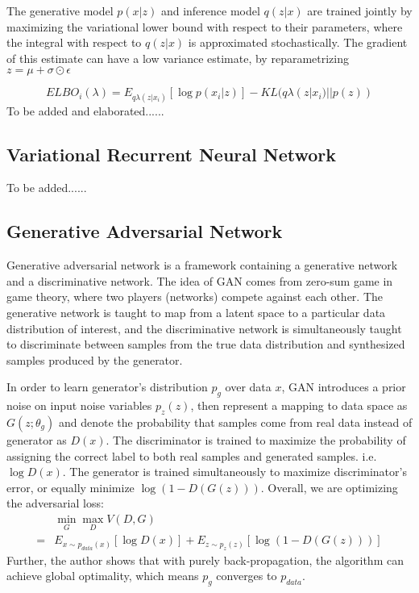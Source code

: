 \documentclass{article}
\begin{document}
The generative model $p(x|z)$ and inference model $q(z|x)$ are trained jointly by maximizing the variational lower bound with respect to their parameters, where the integral with respect to $q(z|x)$ is approximated stochastically. The gradient of this estimate can have a low variance estimate, by reparametrizing $z = \mu+\sigma\odot\epsilon$

$$ELBO_i (\lambda) = E_{q\lambda (z|x_i)}[\log p(x_i|z)]-KL(q\lambda (z|x_i)||p(z))$$ 
To be added and elaborated......


\subsection{Variational Recurrent Neural Network}
\cite{vrnn} 
To be added......

\subsection{Generative Adversarial Network} 
\cite{gan} 
 
\cite{ganncm}

Generative adversarial network is a framework containing a generative network and a discriminative network. The idea of GAN comes from zero-sum game in game theory, where two players (networks) compete against each other. The generative network is taught to map from a latent space to a particular data distribution of interest, and the discriminative network is simultaneously taught to discriminate between samples from the true data distribution and synthesized samples produced by the generator.

In order to learn generator's distribution $p_g$ over data $x$, GAN introduces a prior noise on input noise variables $p_z(z)$, then represent a mapping to data space as $G(z;\theta_g)$ and denote the probability that samples come from real data instead of generator as $D(x)$. The discriminator is trained to maximize the probability of assigning the correct label to both real samples and generated samples. i.e. $\log D(x)$. The generator is trained simultaneously to maximize discriminator's error, or equally minimize $\log (1-D(G(z)))$. Overall, we are optimizing the adversarial loss:
\begin{align*}
& \min_G \max_D V(D,G) \\
= & E_{x\sim p_{data}(x)}[\log D(x)] + E_{z\sim p_z(z)}[\log (1-D(G(z)))]
\end{align*}
Further, the author shows that with purely back-propagation, the algorithm can achieve global optimality, which means $p_g$ converges to $p_{data}$.
\end{document}
